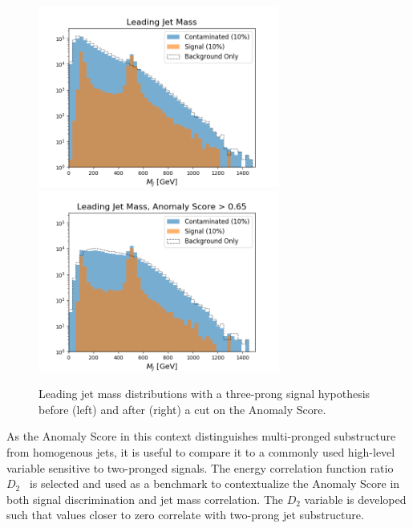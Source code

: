 \documentclass[12pt, a4paper]{article}
\begin{document}
\begin{figure}[H]
	\begin{center}
		\includegraphics[width=225pt]{imgs/bugfix/3Prong_Contaminated_10p0_J_Mass_Multi_Lead_SaveForPaper.png}
		\includegraphics[width=225pt]{imgs/bugfix/3Prong_Contaminated_10p0_J_Mass_AnomScore0p65_Multi_Lead_SaveForPaper.png}
	\end{center}
	\caption{Leading jet mass distributions with a three-prong signal hypothesis before (left) and after (right) a cut on the Anomaly Score.}
	\label{fig:3P_lj_mass}
\end{figure}




As the Anomaly Score in this context distinguishes multi-pronged substructure from homogenous jets, it is useful to compare it to a commonly used high-level variable sensitive to two-pronged signals. The energy correlation function ratio $D_2$~\cite{d2} is selected and used as a benchmark to contextualize the Anomaly Score in both signal discrimination and jet mass correlation. The $D_2$ variable is developed such that values closer to zero correlate with two-prong jet substructure. 
\end{document}
